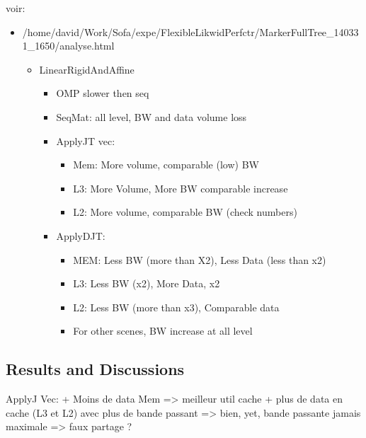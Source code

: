 voir:
\begin{itemize}
    \item /home/david/Work/Sofa/expe/FlexibleLikwidPerfctr/MarkerFullTree\_140331\_1650/analyse.html
        \begin{itemize}
            \item LinearRigidAndAffine
                \begin{itemize}
                    \item OMP slower then seq
                    \item SeqMat: all level, BW and data volume loss
                    \item ApplyJT vec:
                        \begin{itemize}
                            \item Mem: More volume, comparable (low) BW
                            \item L3: More Volume, More BW comparable increase
                            \item L2: More volume, comparable BW (check
                                numbers)
                        \end{itemize}
                    \item ApplyDJT:
                        \begin{itemize}
                            \item MEM: Less BW (more than X2), Less Data (less than x2)
                            \item L3: Less BW (x2), More Data, x2
                            \item L2: Less BW (more than x3), Comparable data
                            \item For other scenes, BW increase at all level
                        \end{itemize}
                \end{itemize}
        \end{itemize}
\end{itemize}




\subsection{Results and Discussions}


ApplyJ Vec:
    + Moins de data Mem => meilleur util cache
    + plus de data en cache (L3 et L2) avec plus de bande passant => bien,
    yet, bande passante jamais maximale => faux partage ?

